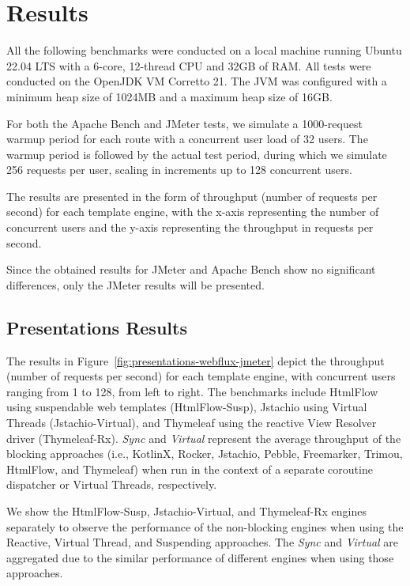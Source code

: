 \section{Results}

All the following benchmarks were conducted on a local machine running Ubuntu
22.04 LTS with a 6-core, 12-thread CPU and 32GB of RAM\@. All tests were
conducted on the OpenJDK VM Corretto 21. The JVM was configured with a minimum
heap size of 1024MB and a maximum heap size of 16GB\@.

For both the Apache Bench and JMeter tests, we simulate a 1000-request warmup
period for each route with a concurrent user load of 32 users. The warmup
period is followed by the actual test period, during which we simulate 256
requests per user, scaling in increments up to 128 concurrent users.

The results are presented in the form of throughput (number of requests per
second) for each template engine, with the x-axis representing the number of
concurrent users and the y-axis representing the throughput in requests per
second.

Since the obtained results for JMeter and Apache Bench show no significant
differences, only the JMeter results will be presented.

\subsection{Presentations Results}

The results in Figure~\ref{fig:presentations-webflux-jmeter} depict the
throughput (number of requests per second) for each template engine, with
concurrent users ranging from 1 to 128, from left to right. The benchmarks
include HtmlFlow using suspendable web templates (HtmlFlow-Susp), Jstachio
using Virtual Threads (Jstachio-Virtual), and Thymeleaf using the reactive View
Resolver driver (Thymeleaf-Rx). \textit{Sync} and \textit{Virtual} represent
the average throughput of the blocking approaches (i.e., KotlinX, Rocker,
Jstachio, Pebble, Freemarker, Trimou, HtmlFlow, and Thymeleaf) when run in the
context of a separate coroutine dispatcher or Virtual Threads, respectively.

We show the HtmlFlow-Susp, Jstachio-Virtual, and Thymeleaf-Rx engines
separately to observe the performance of the non-blocking engines when using
the Reactive, Virtual Thread, and Suspending approaches. The \textit{Sync} and
\textit{Virtual} are aggregated due to the similar performance of different
engines when using those approaches.


